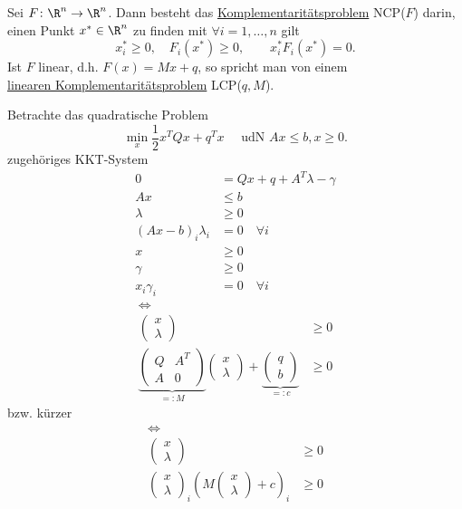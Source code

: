 \begin{definition}
\label{thm:komplementaritätsproblem}
Sei $F \colon \R^{n} \rightarrow \R^{n} $. Dann besteht das \underline{Komplementaritätsproblem}  NCP($F$) darin, einen Punkt ${x}^{*} \in \R^{n}$ zu finden mit $\forall i=1, \ldots, n$ gilt
\[
	x_{i}^{*} \geq  0,\quad F_{i}({x}^{*}) \geq 0, \qquad x_{i}^{*}F_{i}({x}^{*}) = 0
.\] 
Ist $F$ linear, d.h. $F(x) = Mx + q$, so spricht man von einem\\ \underline{linearen Komplementaritätsproblem} LCP($q,M$).
\end{definition}

\begin{beisp}
\label{thm:komplementaritätsproblembeispiel}
	Betrachte das quadratische Problem
	\[
	\min\limits_{x}\frac{1}{2} x^{T} Q x + q^{T}x \quad \text{ udN } Ax \leq  b, x \geq  0
	.\] 
	zugehöriges KKT-System
	\begin{align*}
		0 &= Qx + q + A^{T} \lambda - \gamma  \\
		Ax &\leq  b \\
		\lambda &\geq  0 \\
		(Ax-b)_{i}\lambda _{i} &= 0 \quad \forall i \\
		x &\geq  0 \\
		\gamma &\geq  0 \\
		x_{i}\gamma_{i} &= 0 \quad \forall i
	\end{align*}
	\begin{align*}
		\iff\qquad\qquad\qquad\qquad\qquad &\\
	\begin{pmatrix}
	x \\
	\lambda 
\end{pmatrix} &\geq 0 \\
\underbrace{\begin{pmatrix}
		Q & A^{T} \\ A & 0
\end{pmatrix}
}_{=:M} \begin{pmatrix}
x \\ \lambda 
\end{pmatrix}
+ \underbrace{\begin{pmatrix}
q \\ b
\end{pmatrix}
}_{=:c} 
&\geq 0
	\end{align*}
	bzw. kürzer
	\begin{align*}
		\iff\qquad\qquad\qquad\qquad\qquad &\\
	\begin{pmatrix}
	x \\
	\lambda 
\end{pmatrix} &\geq 0 \\
\begin{pmatrix}
x \\ \lambda 
\end{pmatrix}
_{i}\left( M \begin{pmatrix}
x \\ \lambda 
\end{pmatrix}
	+ c \right) _{i} &\geq  0
	\end{align*}
\end{beisp}

